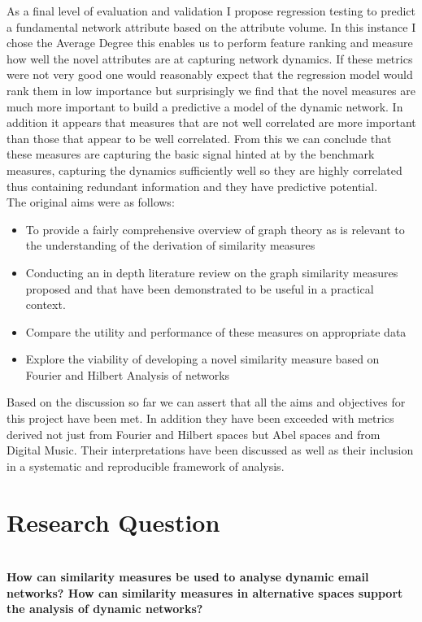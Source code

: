 As a final level of evaluation and validation I propose regression testing to predict a fundamental network attribute based on the attribute volume. In this instance I chose the Average Degree this enables us to perform feature ranking and measure how well the novel attributes are at capturing network dynamics. If these metrics were not very good one would reasonably expect that the regression model would rank them in low importance but surprisingly we find that the novel measures are much more important to build a predictive a model of the dynamic network. In addition it appears that measures that are not well correlated are more important than those that appear to be well correlated. From this we can conclude that these measures are capturing the basic signal hinted at by the benchmark measures, capturing the dynamics sufficiently well so they are highly correlated thus containing redundant information and they have predictive potential. \\

The original aims were as follows:
\begin{itemize}
    \item To provide a fairly comprehensive overview of graph theory as is relevant to the understanding of the derivation of similarity measures
    \item Conducting an in depth literature review on the graph similarity measures proposed and that have been demonstrated to be useful in a practical context.
    \item Compare the utility and performance of these measures on appropriate data
    \item Explore the viability of developing a novel similarity measure based on Fourier and Hilbert Analysis of networks
\end{itemize}

Based on the discussion so far we can assert that all the aims and objectives for this project have been met. In addition they have been exceeded with metrics derived not just from Fourier and Hilbert spaces but Abel spaces and from Digital Music. Their interpretations have been discussed as well as their inclusion in a systematic and reproducible framework of analysis. \\

\section{Research Question}
\\
\textbf{How can similarity measures be used to analyse dynamic email networks? How can similarity measures in alternative spaces support the analysis of dynamic networks?}\\

